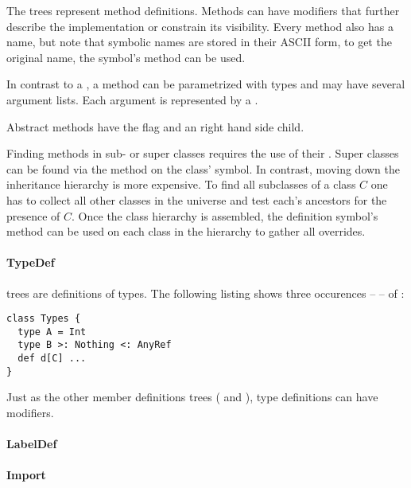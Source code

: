 \noindent The  trees represent method definitions. Methods can have modifiers that further describe the implementation or constrain its visibility. Every method also has a name, but note that symbolic names are stored in their ASCII form, to get the original name, the symbol's  method can be used.

In contrast to a , a method can be parametrized with types and may have several argument lists. Each argument is represented by a .

Abstract methods have the  flag and an  right hand side child.

Finding methods in sub- or super classes requires the use of their . Super classes can be found via the  method on the class' symbol. In contrast, moving down the inheritance hierarchy is more expensive. To find all subclasses of a class $C$ one has to collect all other classes in the universe and test each's ancestors for the presence of $C$. Once the class hierarchy is assembled, the definition symbol's  method can be used on each class in the hierarchy to gather all overrides.

\paragraph{TypeDef} 

\noindent {} trees are definitions of types. The following listing shows three occurences --  -- of :

\begin{lstlisting}
class Types {
  type A = Int
  type B >: Nothing <: AnyRef
  def d[C] ...
}
\end{lstlisting}

Just as the other member definitions trees ( and ), type definitions can have modifiers.

\paragraph{LabelDef} 

\noindent %

\paragraph{Import} 

